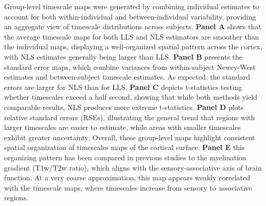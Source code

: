 \documentclass[latex/main.tex]{subfiles}
\begin{document}
Group-level timescale maps were generated by combining individual estimates to account for both within-individual and between-individual variability, providing an aggregate view of timescale distributions across subjects. \textbf{Panel A} shows that the average timescale maps for both LLS and NLS estimators are smoother than the individual maps, displaying a well-organized spatial pattern across the cortex, with NLS estimates generally being larger than LLS. \textbf{Panel B} presents the standard error maps, which combine variances from within-subject Newey-West estimates and between-subject timescale estimates. As expected, the standard errors are larger for NLS than for LLS. \textbf{Panel C} depicts t-statistics testing whether timescales exceed a half second, showing that while both methods yield comparable results, NLS produces more extreme t-statistics. \textbf{Panel D} plots relative standard errors (RSEs), illustrating the general trend that regions with larger timescales are easier to estimate, while areas with smaller timescales exhibit greater uncertainty. Overall, these group-level maps highlight consistent spatial organization of timescales maps of the cortical surface. \textbf{Panel E} this organizing pattern has been compared in previous studies to the myelination gradient (T1w/T2w ratio), which aligns with the sensory-associative axis of brain function. At a very coarse approximation, this map appears weakly correlated with the timescale maps, where timescales increase from sensory to associative regions.
\end{document}
